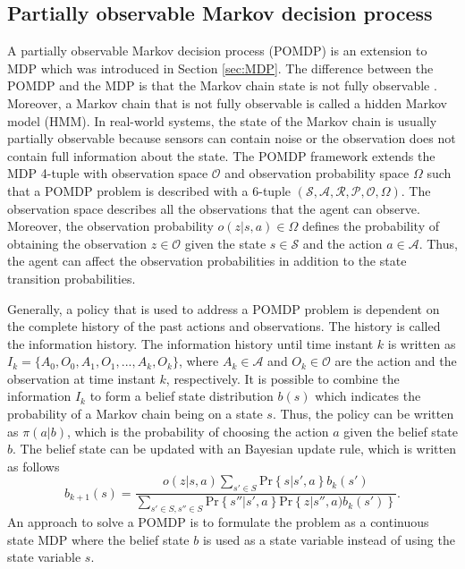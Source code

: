 \documentclass[english, 12pt, a4paper, elec, utf8, a-1b, online]{aaltothesis}
\newcommand{\Ss}{\mathcal{S}}
\newcommand{\As}{\mathcal{A}}
\newcommand{\Rs}{\mathcal{R}}
\newcommand{\Ps}{\mathcal{P}}
\newcommand{\Os}{\mathcal{O}}
\newcommand{\Ops}{\Omega}
\renewcommand{\Pr}[1]{\text{Pr}\left\{ #1 \right\}}
\begin{document}
\subsection{Partially observable Markov decision process} \label{sec:POMDP}


A partially observable Markov decision process (POMDP) is an extension to MDP which was introduced in Section \ref{sec:MDP}. 
The difference between the POMDP and the MDP is that the Markov chain state is not fully observable \cite{Krishnamurthy2016}.
Moreover, a Markov chain that is not fully observable is called a hidden Markov model (HMM).
In real-world systems, the state of the Markov chain is usually partially observable because sensors can contain noise or the observation does not contain full information about the state.
The POMDP framework extends the MDP 4-tuple with observation space $\Os$ and observation probability space $\Ops$ such that a POMDP problem is described with a 6-tuple $(\Ss, \As, \Rs, \Ps, \Os, \Ops)$.
The observation space describes all the observations that the agent can observe.
Moreover, the observation probability $o(z|s, a) \in \Ops$ defines the probability of obtaining the observation $z \in \Os$ given the state $s \in \Ss$ and the action $a \in \As$.
Thus, the agent can affect the observation probabilities in addition to the state transition probabilities. 

Generally, a policy that is used to address a POMDP problem is dependent on the complete history of the past actions and observations. 
The history is called the information history.
The information history until time instant $k$ is written as $I_k=\{A_0, O_0, A_1, O_1, ..., A_k, O_k\}$, where $A_k \in \As$ and $O_k \in \Os$ are the action and the observation at time instant $k$, respectively.
It is possible to combine the information $I_k$ to form a belief state distribution $b(s)$ which indicates the probability of a Markov chain being on a state $s$.
Thus, the policy can be written as $\pi(a | b)$, which is the probability of choosing the action $a$ given the belief state $b$.
The belief state can be updated with an Bayesian update rule, which is written as follows
\begin{equation}\label{eq:belief_state_update}
    b_{k+1}(s) = \frac{o(z | s, a) \sum_{s'\in S} \Pr{s | s', a} b_k(s')}{\sum_{s'\in S, s'' \in S} \Pr{s'' | s', a} \Pr{z | s'', a)b_k(s')}}.
\end{equation}
An approach to solve a POMDP is to formulate the problem as a continuous state MDP where the belief state $b$ is used as a state variable instead of using the state variable $s$.
\end{document}
